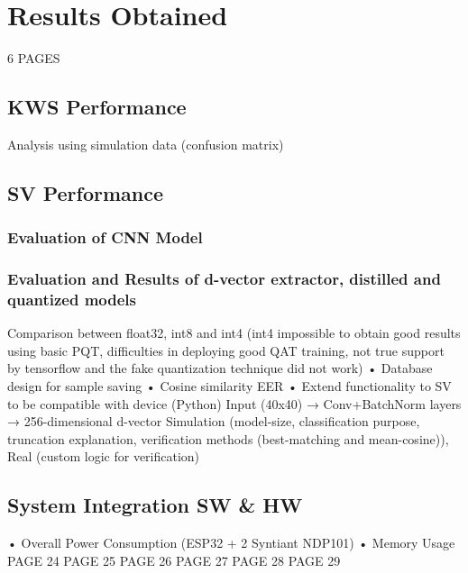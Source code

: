 \chapter{Results Obtained}
\label{cha:results obtained}

6 PAGES\newline\newline
\section{KWS Performance}
\label{sec:kws performance}
Analysis using simulation data (confusion matrix)\newline 
\section{SV Performance}
\label{sec:sv performance}
\subsection{Evaluation of CNN Model}

\subsection{Evaluation and Results of d-vector extractor, distilled and quantized models}
Comparison between float32, int8 and int4 (int4 impossible to obtain good results using basic PQT, difficulties in deploying good QAT training, not true support by tensorflow and the fake quantization technique did not work)\newline 
• Database design for sample saving \newline
• Cosine similarity EER \newline
• Extend functionality to SV to be compatible with device (Python)\newline
Input (40x40) → Conv+BatchNorm layers → 256-dimensional d-vector \newline
Simulation (model-size, classification purpose, truncation explanation, verification methods (best-matching and mean-cosine)), Real (custom logic for verification)\newline

\section{System Integration SW \& HW}
\label{sec: system integration}
• Overall Power Consumption (ESP32 + 2 Syntiant NDP101)\newline
• Memory Usage\newline\newline
PAGE 24
\newpage
PAGE 25
\newpage
PAGE 26
\newpage
PAGE 27
\newpage
PAGE 28
\newpage
PAGE 29
\newpage